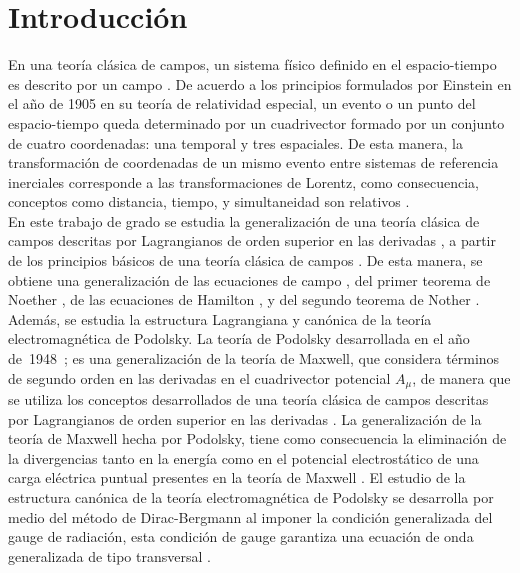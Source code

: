 \documentclass[a4paper,12pt]{article}
\begin{document}
\section{Introducción}
En una teoría clásica de campos, un sistema físico definido en el \mbox{espacio-tiempo} es descrito por un campo \cite{noether}. De acuerdo a los principios formulados por Einstein en el año de 1905 en su teoría de relatividad especial, un evento o un punto del \mbox{espacio-tiempo} queda determinado por un cuadrivector formado por un \mbox{conjunto} de cuatro coordenadas: una temporal y tres espaciales. De esta manera, la \mbox{transformación} de coordenadas de un mismo evento entre sistemas de referencia inerciales corresponde a las transformaciones de Lorentz, como consecuencia, conceptos como distancia, tiempo, y simultaneidad son relativos \cite{noether,rela}.  
\\

En este trabajo de grado se estudia la generalización de una teoría clásica de campos descritas por Lagrangianos de orden superior en las derivadas \cite{general}, a partir de los principios básicos de una teoría clásica de campos \cite{greiner}. De esta manera, se obtiene una generalización de las ecuaciones de campo \cite{general}, del primer teorema de Noether \cite{general}, de las ecuaciones de Hamilton \cite{general}, y del segundo teorema de Nother \cite{vinculos}. 
\\

Además, se estudia la estructura Lagrangiana y canónica de la teoría \mbox{electromagnética} de Podolsky. La teoría de Podolsky desarrollada en el año \mbox{de 1948 \cite{podolsky, podol};} es una generalización de la teoría de Maxwell, que considera  \mbox{términos} de segundo orden en las derivadas en el cuadrivector potencial $A_\mu$, de manera que se utiliza los conceptos desarrollados de una teoría clásica de \mbox{campos} \mbox{descritas} por Lagrangianos de orden superior en las derivadas \cite{general}. La generalización de la teoría de Maxwell hecha por Podolsky, tiene como consecuencia la \mbox{eliminación} de la divergencias tanto en la energía como en el potencial electrostático de una carga eléctrica puntual presentes en la teoría de Maxwell \cite{podolsky}. El estudio de la \mbox{estructura} canónica de la teoría \mbox{electromagnética} de Podolsky se desarrolla por medio del \mbox{método} de Dirac-Bergmann al imponer la condición generalizada del gauge de \mbox{radiación,} esta condición de gauge garantiza una ecuación de onda generalizada de tipo transversal \cite{podolsky}. 
\\
\end{document}
